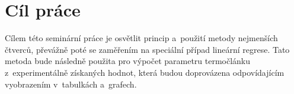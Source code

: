 \section{Cíl práce}
Cílem této seminární práce je osvětlit princip a~použití metody nejmenších
čtverců, převážně poté se zaměřením na speciální případ lineární regrese. Tato
metoda bude následně použita pro výpočet parametru termočlánku z~experimentálně
získaných hodnot, která budou doprovázena odpovídajícím vyobrazením v~tabulkách
a~grafech. 
